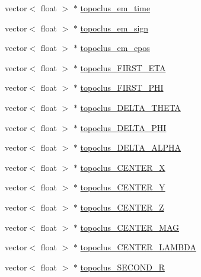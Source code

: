 \begin{DoxyCompactItemize}
\item 
vector$<$ float $>$ $\ast$ \hyperlink{classJetAnalysisExample_a382cdad2b0ef6bc203f21efb62e42631}{topoclus\+\_\+em\+\_\+time}
\item 
vector$<$ float $>$ $\ast$ \hyperlink{classJetAnalysisExample_aff62bd1f2c28b4a4f8358d1938538203}{topoclus\+\_\+em\+\_\+sign}
\item 
vector$<$ float $>$ $\ast$ \hyperlink{classJetAnalysisExample_a3fd5693495127ea1a25306ba4fb2579d}{topoclus\+\_\+em\+\_\+epos}
\item 
vector$<$ float $>$ $\ast$ \hyperlink{classJetAnalysisExample_af19955a2f14912d1a3eafa2b503d3afa}{topoclus\+\_\+\+F\+I\+R\+S\+T\+\_\+\+E\+TA}
\item 
vector$<$ float $>$ $\ast$ \hyperlink{classJetAnalysisExample_adf210bfc6ccbb903d82551f63cabe066}{topoclus\+\_\+\+F\+I\+R\+S\+T\+\_\+\+P\+HI}
\item 
vector$<$ float $>$ $\ast$ \hyperlink{classJetAnalysisExample_aeb11120db0e9eef451d419df28d23345}{topoclus\+\_\+\+D\+E\+L\+T\+A\+\_\+\+T\+H\+E\+TA}
\item 
vector$<$ float $>$ $\ast$ \hyperlink{classJetAnalysisExample_a4e3128e61aa18388a1bd54320a0e3d46}{topoclus\+\_\+\+D\+E\+L\+T\+A\+\_\+\+P\+HI}
\item 
vector$<$ float $>$ $\ast$ \hyperlink{classJetAnalysisExample_ac759dc95849acf9c06d1849ad8ed8fa4}{topoclus\+\_\+\+D\+E\+L\+T\+A\+\_\+\+A\+L\+P\+HA}
\item 
vector$<$ float $>$ $\ast$ \hyperlink{classJetAnalysisExample_a3d42463ab1755c787082239ca1853a92}{topoclus\+\_\+\+C\+E\+N\+T\+E\+R\+\_\+X}
\item 
vector$<$ float $>$ $\ast$ \hyperlink{classJetAnalysisExample_ad754f491964e19a5005e751b168c04a0}{topoclus\+\_\+\+C\+E\+N\+T\+E\+R\+\_\+Y}
\item 
vector$<$ float $>$ $\ast$ \hyperlink{classJetAnalysisExample_ad4d3c698fc1a72fe4e293d3075c291a4}{topoclus\+\_\+\+C\+E\+N\+T\+E\+R\+\_\+Z}
\item 
vector$<$ float $>$ $\ast$ \hyperlink{classJetAnalysisExample_af226e69c5eb94a38546503512865ff78}{topoclus\+\_\+\+C\+E\+N\+T\+E\+R\+\_\+\+M\+AG}
\item 
vector$<$ float $>$ $\ast$ \hyperlink{classJetAnalysisExample_a3f4a5e7dc371dbd2340e8b1630fd90bc}{topoclus\+\_\+\+C\+E\+N\+T\+E\+R\+\_\+\+L\+A\+M\+B\+DA}
\item 
vector$<$ float $>$ $\ast$ \hyperlink{classJetAnalysisExample_aa2698b7d8dd64be617bbbd1054349c40}{topoclus\+\_\+\+S\+E\+C\+O\+N\+D\+\_\+R}
\item 

\end{DoxyCompactItemize}
